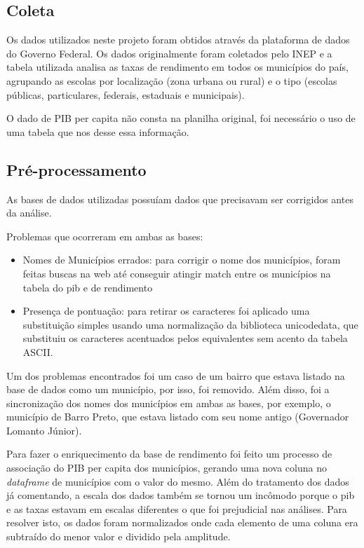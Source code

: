 \documentclass[review]{elsarticle}
\begin{document}
\subsection{Coleta}
Os dados utilizados neste projeto foram obtidos através da plataforma de dados do Governo Federal. Os dados originalmente foram coletados pelo INEP e a tabela utilizada analisa as taxas de rendimento em todos os municípios do país, agrupando as escolas por localização (zona urbana ou rural) e o tipo (escolas públicas, particulares, federais, estaduais e municipais).\par
O dado de PIB per capita não consta na planilha original, foi necessário o uso de uma tabela que nos desse essa informação.\par

\subsection{Pré-processamento}
As bases de dados utilizadas possuíam dados que precisavam ser corrigidos antes da análise.\par
Problemas que ocorreram em ambas as bases:\par
\begin{itemize}
    \item Nomes de Municípios errados: para corrigir o nome dos municípios, foram feitas buscas na web até conseguir atingir match entre os municípios na tabela do pib e de rendimento 
    \item Presença de pontuação: para retirar os caracteres foi aplicado uma substituição simples usando uma normalização da biblioteca unicodedata, que substituiu os caracteres acentuados pelos equivalentes sem acento da tabela ASCII. 
\end{itemize}
Um dos problemas encontrados foi um caso de um bairro que estava listado na base de dados como um município, por isso, foi removido. Além disso, foi a sincronização dos nomes dos municípios em ambas as bases, por exemplo, o município de Barro Preto, que estava listado com seu nome antigo (Governador Lomanto Júnior).\par
Para fazer o enriquecimento da base de rendimento foi feito um processo de associação do PIB per capita dos municípios, gerando uma nova coluna no \emph{dataframe} de municípios com o valor do mesmo.
Além do tratamento dos dados já comentando, a escala dos dados também se tornou um incômodo porque o pib e as taxas estavam em escalas diferentes o que foi prejudicial nas análises. Para resolver isto, os dados foram normalizados onde cada elemento de uma coluna era subtraído do menor valor e dividido pela amplitude.\par
\end{document}
